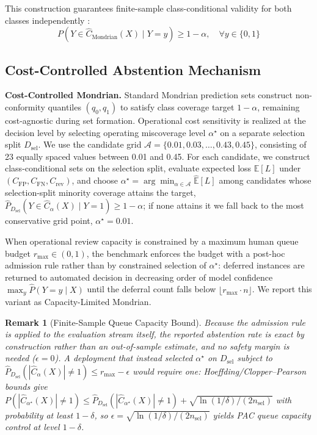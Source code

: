 \documentclass{ieeetj}
\newtheorem{remark}{Remark}
\begin{document}
This construction guarantees finite-sample class-conditional validity for both classes independently \cite{vovk2012conditional}:
\begin{equation}
P(Y \in \hat{C}_{\mathrm{Mondrian}}(X) \mid Y = y) \ge 1 - \alpha, \quad \forall y \in \{0, 1\}
\end{equation}

\subsection{Cost-Controlled Abstention Mechanism}\label{subsec:costctrl}
\textbf{Cost-Controlled Mondrian.} Standard Mondrian prediction sets construct non-conformity quantiles $(q_0, q_1)$ to satisfy class coverage target $1-\alpha$, remaining cost-agnostic during set formation. Operational cost sensitivity is realized at the decision level by selecting operating miscoverage level $\alpha^\star$ on a separate selection split $D_{\mathrm{sel}}$. We use the candidate grid $\mathcal{A}=\{0.01,0.03,\ldots,0.43,0.45\}$, consisting of 23 equally spaced values between 0.01 and 0.45. For each candidate, we construct class-conditional sets on the selection split, evaluate expected loss $\mathbb{E}[L]$ under $(C_{\mathrm{FP}}, C_{\mathrm{FN}}, C_{\mathrm{rev}})$, and choose $\alpha^\star = \arg\min_{\alpha \in \mathcal{A}} \widehat{\mathbb{E}}[L]$ among candidates whose selection-split minority coverage attains the target, $\widehat{P}_{D_{\mathrm{sel}}}(Y \in \hat{C}_\alpha(X) \mid Y=1) \ge 1-\alpha$; if none attains it we fall back to the most conservative grid point, $\alpha^\star = 0.01$.

When operational review capacity is constrained by a maximum human queue budget $r_{\max} \in (0,1)$, the benchmark enforces the budget with a post-hoc admission rule rather than by constrained selection of $\alpha^\star$: deferred instances are returned to automated decision in decreasing order of model confidence $\max_y \hat{P}(Y=y \mid X)$ until the deferral count falls below $\lfloor r_{\max} \cdot n \rfloor$. We report this variant as Capacity-Limited Mondrian.
\begin{remark}[Finite-Sample Queue Capacity Bound]
Because the admission rule is applied to the evaluation stream itself, the reported abstention rate is exact by construction rather than an out-of-sample estimate, and no safety margin is needed ($\epsilon = 0$). A deployment that instead selected $\alpha^\star$ on $D_{\mathrm{sel}}$ subject to $\hat{P}_{D_{\mathrm{sel}}}(|\hat{C}_\alpha(X)| \neq 1) \le r_{\max} - \epsilon$ would require one: Hoeffding/Clopper--Pearson bounds give $P(|\hat{C}_{\alpha^\star}(X)| \neq 1) \le \hat{P}_{D_{\mathrm{sel}}}(|\hat{C}_{\alpha^\star}(X)| \neq 1) + \sqrt{\ln(1/\delta)/(2 n_{\mathrm{sel}})}$ with probability at least $1-\delta$, so $\epsilon = \sqrt{\ln(1/\delta)/(2 n_{\mathrm{sel}})}$ yields PAC queue capacity control at level $1-\delta$.
\end{remark}
\end{document}
